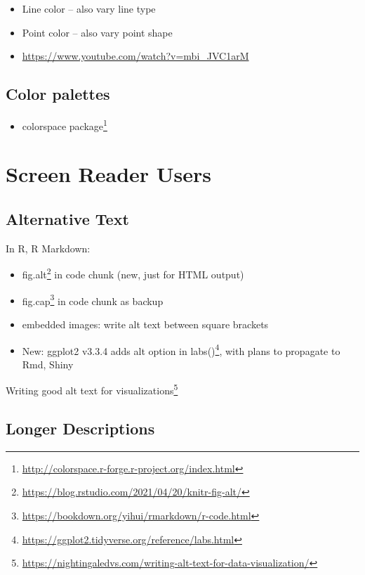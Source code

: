 \documentclass[
]{krantz}
\providecommand{\tightlist}{%
  \setlength{\itemsep}{0pt}\setlength{\parskip}{0pt}}
\renewcommand{\href}[2]{#2\footnote{\url{#1}}}
\begin{document}
\begin{itemize}
\item
  Line color -- also vary line type
\item
  Point color -- also vary point shape
\item
  \url{https://www.youtube.com/watch?v=mbi_JVC1arM}
\end{itemize}

\hypertarget{color-palettes}{%
\subsection{Color palettes}\label{color-palettes}}

\begin{itemize}
\tightlist
\item
  \href{http://colorspace.r-forge.r-project.org/index.html}{colorspace package}
\end{itemize}

\hypertarget{screen-reader-users}{%
\section{Screen Reader Users}\label{screen-reader-users}}

\hypertarget{alternative-text}{%
\subsection{Alternative Text}\label{alternative-text}}

In R, R Markdown:

\begin{itemize}
\item
  \href{https://blog.rstudio.com/2021/04/20/knitr-fig-alt/}{fig.alt} in code chunk (new, just for HTML output)
\item
  \href{https://bookdown.org/yihui/rmarkdown/r-code.html}{fig.cap} in code chunk as backup
\item
  embedded images: write alt text between square brackets
\item
  New: ggplot2 v3.3.4 adds \href{https://ggplot2.tidyverse.org/reference/labs.html}{alt option in labs()}, with plans to propagate to Rmd, Shiny
\end{itemize}

\href{https://nightingaledvs.com/writing-alt-text-for-data-visualization/}{Writing good alt text for visualizations}

\hypertarget{longer-descriptions}{%
\subsection{Longer Descriptions}\label{longer-descriptions}}
\end{document}
